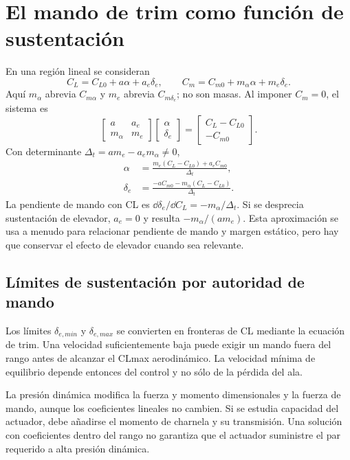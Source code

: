 \section{El mando de trim como función de sustentación}
En una región lineal se consideran
\begin{equation}
C_L=C_{L0}+a\alpha+a_e\delta_e,\qquad
C_m=C_{m0}+m_\alpha\alpha+m_e\delta_e.
\end{equation}
Aquí $m_\alpha$ abrevia $C_{m\alpha}$ y $m_e$ abrevia $C_{m\delta_e}$; no son masas. Al imponer $C_m=0$, el sistema es
\begin{equation}
\begin{bmatrix}a&a_e\\m_\alpha&m_e\end{bmatrix}
\begin{bmatrix}\alpha\\\delta_e\end{bmatrix}
=\begin{bmatrix}C_L-C_{L0}\\-C_{m0}\end{bmatrix}.
\end{equation}
Con determinante $\Delta_t=am_e-a_em_\alpha\neq0$,
\begin{align}
\alpha&=\frac{m_e(C_L-C_{L0})+a_eC_{m0}}{\Delta_t},\\
\delta_e&=\frac{-aC_{m0}-m_\alpha(C_L-C_{L0})}{\Delta_t}.
\end{align}
La pendiente de mando con CL es $\dd\delta_e/\dd C_L=-m_\alpha/\Delta_t$. Si se desprecia sustentación de elevador, $a_e=0$ y resulta $-m_\alpha/(am_e)$. Esta aproximación se usa a menudo para relacionar pendiente de mando y margen estático, pero hay que conservar el efecto de elevador cuando sea relevante.

\subsection{Límites de sustentación por autoridad de mando}
Los límites $\delta_{e,min}$ y $\delta_{e,max}$ se convierten en fronteras de CL mediante la ecuación de trim. Una velocidad suficientemente baja puede exigir un mando fuera del rango antes de alcanzar el CLmax aerodinámico. La velocidad mínima de equilibrio depende entonces del control y no sólo de la pérdida del ala.

La presión dinámica modifica la fuerza y momento dimensionales y la fuerza de mando, aunque los coeficientes lineales no cambien. Si se estudia capacidad del actuador, debe añadirse el momento de charnela y su transmisión. Una solución con coeficientes dentro del rango no garantiza que el actuador suministre el par requerido a alta presión dinámica.

